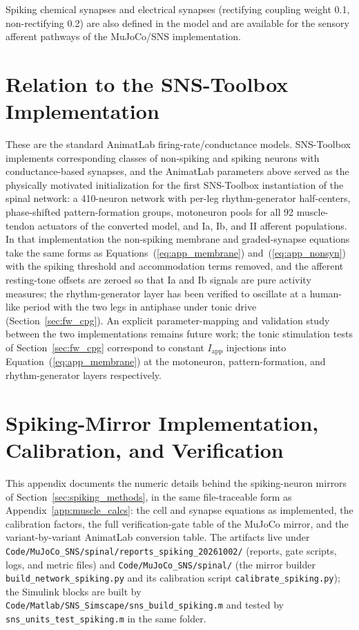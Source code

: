 Spiking chemical synapses and electrical synapses (rectifying coupling weight 0.1, non-rectifying 0.2) are also defined in the model and are available for the sensory afferent pathways of the MuJoCo/SNS implementation.

\section{Relation to the SNS-Toolbox Implementation}

These are the standard AnimatLab firing-rate/conductance models. SNS-Toolbox \citep{nourse_sns_2023} implements corresponding classes of non-spiking and spiking neurons with conductance-based synapses, and the AnimatLab parameters above served as the physically motivated initialization for the first SNS-Toolbox instantiation of the spinal network: a 410-neuron network with per-leg rhythm-generator half-centers, phase-shifted pattern-formation groups, motoneuron pools for all 92 muscle-tendon actuators of the converted model, and Ia, Ib, and II afferent populations. In that implementation the non-spiking membrane and graded-synapse equations take the same forms as Equations~(\ref{eq:app_membrane}) and~(\ref{eq:app_nonsyn}) with the spiking threshold and accommodation terms removed, and the afferent resting-tone offsets are zeroed so that Ia and Ib signals are pure activity measures; the rhythm-generator layer has been verified to oscillate at a human-like period with the two legs in antiphase under tonic drive (Section~\ref{sec:fw_cpg}). An explicit parameter-mapping and validation study between the two implementations remains future work; the tonic stimulation tests of Section~\ref{sec:fw_cpg} correspond to constant $I_{\text{app}}$ injections into Equation~(\ref{eq:app_membrane}) at the motoneuron, pattern-formation, and rhythm-generator layers respectively.

\section{Spiking-Mirror Implementation, Calibration, and Verification}\label{app:spiking_details}

This appendix documents the numeric details behind the spiking-neuron mirrors of Section~\ref{sec:spiking_methods}, in the same file-traceable form as Appendix~\ref{app:muscle_calcs}: the cell and synapse equations as implemented, the calibration factors, the full verification-gate table of the MuJoCo mirror, and the variant-by-variant AnimatLab conversion table. The artifacts live under \texttt{Code/MuJoCo\_SNS/spinal/reports\_spiking\_20261002/} (reports, gate scripts, logs, and metric files) and \texttt{Code/MuJoCo\_SNS/spinal/} (the mirror builder \texttt{build\_network\_spiking.py} and its calibration script \texttt{calibrate\_spiking.py}); the Simulink blocks are built by \texttt{Code/Matlab/SNS\_Simscape/sns\_build\_spiking.m} and tested by \texttt{sns\_units\_test\_spiking.m} in the same folder.

